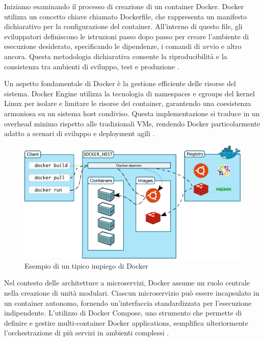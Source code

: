 Iniziamo esaminando il processo di creazione di un container Docker. Docker utilizza un concetto chiave chiamato Dockerfile, che rappresenta un manifesto dichiarativo per la configurazione del container. All'interno di questo file, gli sviluppatori definiscono le istruzioni passo dopo passo per creare l'ambiente di esecuzione desiderato, specificando le dipendenze, i comandi di avvio e altro ancora. Questa metodologia dichiarativa consente la riproducibilità e la consistenza tra ambienti di sviluppo, test e produzione \cite{turnbull2014docker}.

Un aspetto fondamentale di Docker è la gestione efficiente delle risorse del sistema. Docker Engine utilizza la tecnologia di namespaces e cgroups del kernel Linux per isolare e limitare le risorse dei container, garantendo una coesistenza armoniosa su un sistema host condiviso. Questa implementazione si traduce in un overhead minimo rispetto alle tradizionali VMs, rendendo Docker particolarmente adatto a scenari di sviluppo e deployment agili \cite{merkel2014docker}.

\begin{figure}[h]
    \centering
    \includegraphics[width=\linewidth]{figures/ch3/docker-example.png}
    \caption[Esempio di un tipico impiego di Docker]{Esempio di un tipico impiego di Docker}
    \label{fig:cha3:docker}
\end{figure}

Nel contesto delle architetture a microservizi, Docker assume un ruolo centrale nella creazione di unità modulari. Ciascun microservizio può essere incapsulato in un container autonomo, fornendo un'interfaccia standardizzata per l'esecuzione indipendente. L'utilizzo di Docker Compose, uno strumento che permette di definire e gestire multi-container Docker applications, semplifica ulteriormente l'orchestrazione di più servizi in ambienti complessi \cite{boettiger2015introduction}.


